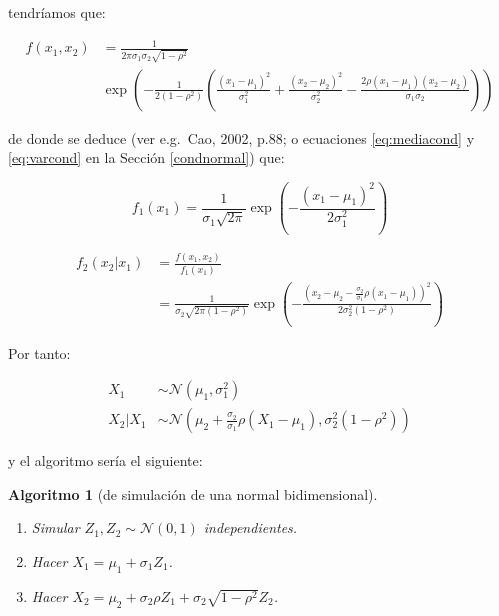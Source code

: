 \documentclass[
]{book}
\theoremstyle{break}
\newtheorem{conjecture}{Algoritmo}[chapter]
\theoremstyle{definition}
\theoremstyle{definition}
\theoremstyle{definition}
\theoremstyle{definition}
\theoremstyle{remark}
\begin{document}
tendríamos que:

\[\begin{aligned}
f(x_1,x_2) &= \frac{1}{2 \pi \sigma_1 \sigma_2 \sqrt{1-\rho^2}} \\
&\exp \left( -\frac{1}{2 (1-\rho^2)} \left( \frac{(x_1 - \mu_1)^2}{\sigma_1^2} + \frac{(x_2 - \mu_2)^2}{\sigma_2^2} - \frac{2 \rho (x_1 - \mu_1) (x_2 - \mu_2)}{ \sigma_1 \sigma_2} \right)
\right)
\end{aligned}\]

de donde se deduce (ver e.g.~Cao, 2002, p.88; o ecuaciones \eqref{eq:mediacond} y \eqref{eq:varcond} en la Sección \ref{condnormal}) que:

\[f_1( x_1 ) = \frac{1}{\sigma_1\sqrt{2\pi}}
\exp\left( -\frac{(x_1 - \mu_1)^{2}}{2\sigma_1^{2}}\right)\]

\[\begin{aligned}
f_2\left( x_2|x_1\right)  &= \frac{f\left( x_1,x_2\right)  }{f_1\left( x_1\right)} \\ &= \frac{1}{\sigma_2\sqrt{2\pi (1-\rho^2)}}
\exp\left( -\frac{\left(x_2 - \mu_2 - \frac{\sigma_2}{\sigma_1}\rho( x_1 - \mu_1)\right)^{2}}{2\sigma_2^2 (1-\rho^2)}\right)
\end{aligned}\]

Por tanto:

\[\begin{aligned}
X_1 &\sim \mathcal{N}\left( \mu_1, \sigma_1^2 \right) \\
X_2 | X_1 &\sim \mathcal{N} \left( \mu_2 + \frac{\sigma_2}{\sigma_1}\rho( X_1 - \mu_1), \sigma_2^2 (1-\rho^2) \right)
\end{aligned}\]

y el algoritmo sería el siguiente:

\begin{conjecture}[de simulación de una normal bidimensional]
\protect\hypertarget{cnj:norm-bidim-cond}{}{\label{cnj:norm-bidim-cond} {} }

\begin{enumerate}
\def\labelenumi{\arabic{enumi}.}
\item
  Simular \(Z_1, Z_2 \sim \mathcal{N}\left( 0, 1 \right)\) independientes.
\item
  Hacer \(X_1 = \mu_1 + \sigma_1 Z_1\).
\item
  Hacer \(X_2 =\mu_2 + \sigma_2 \rho Z_1 + \sigma_2 \sqrt{1-\rho^2} Z_2\).
\end{enumerate}
\end{conjecture}
\end{document}
